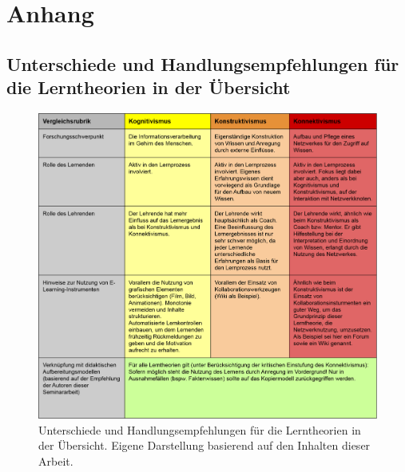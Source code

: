 \chapter{Anhang}
\newpage
\section{Unterschiede und Handlungsempfehlungen für die Lerntheorien in der Übersicht}
\begin{figure}[h]
	\centering
	\includegraphics[width=1.0\textwidth]{Abbildungen/Gegenuberstellung.png}
	\caption{Unterschiede und Handlungsempfehlungen für die Lerntheorien in der Übersicht. Eigene Darstellung basierend auf den Inhalten dieser Arbeit.}
	\label{fig:Unterschiede und Handlungsempfehlungen für die Lerntheorien}
\end{figure}